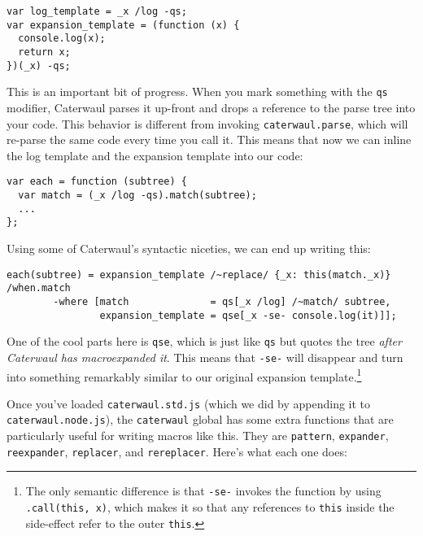 \documentclass{report}
\begin{document}
\begin{verbatim}
var log_template = _x /log -qs;
var expansion_template = (function (x) {
  console.log(x);
  return x;
})(_x) -qs;
\end{verbatim}

    This is an important bit of progress. When you mark something with the {\tt qs} modifier, Caterwaul parses it up-front and drops a reference to the parse tree into your code. This behavior
    is different from invoking {\tt caterwaul.parse}, which will re-parse the same code every time you call it. This means that now we can inline the log template and the expansion template
    into our code:

\begin{verbatim}
var each = function (subtree) {
  var match = (_x /log -qs).match(subtree);
  ...
};
\end{verbatim}

    Using some of Caterwaul's syntactic niceties, we can end up writing this:

\begin{verbatim}
each(subtree) = expansion_template /~replace/ {_x: this(match._x)} /when.match
        -where [match              = qs[_x /log] /~match/ subtree,
                expansion_template = qse[_x -se- console.log(it)]];
\end{verbatim}

    One of the cool parts here is {\tt qse}, which is just like {\tt qs} but quotes the tree {\em after Caterwaul has macroexpanded it}. This means that {\tt -se-} will disappear and turn into
    something remarkably similar to our original expansion template.\footnote{The only semantic difference is that {\tt -se-} invokes the function by using {\tt .call(this, x)}, which makes it
    so that any references to {\tt this} inside the side-effect refer to the outer {\tt this}.}

    Once you've loaded {\tt caterwaul.std.js} (which we did by appending it to {\tt caterwaul.node.js}), the {\tt caterwaul} global has some extra functions that are particularly useful for
    writing macros like this. They are {\tt pattern}, {\tt expander}, {\tt reexpander}, {\tt replacer}, and {\tt rereplacer}. Here's what each one does:
\end{document}
